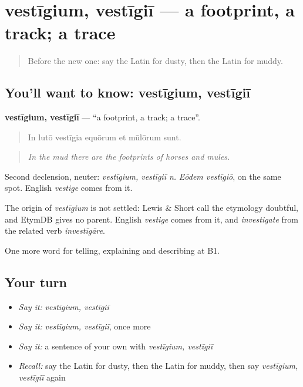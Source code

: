 \section[vestīgium, vestīgiī]{vestīgium, vestīgiī — a footprint, a track; a trace}

\label{lesson:LA-C426-vestigium}



\begin{quote}
Before the new one: say the Latin for dusty, then the Latin for muddy.
\end{quote}

\subsection*{You'll want to know: vestīgium, vestīgiī}
\textbf{vestīgium, vestīgiī} — \textquotedblleft{}a footprint, a track; a trace\textquotedblright{}.

\begin{quote}
In lutō vestīgia equōrum et mūlōrum sunt.
\end{quote}

\begin{quote}
\emph{In the mud there are the footprints of horses and mules.}
\end{quote}

Second declension, neuter: \emph{vestīgium, vestīgiī n.} \emph{Eōdem vestīgiō}, on the same spot. English \emph{vestige} comes from it.

\begin{cousinweb}
The origin of \emph{vestīgium} is not settled: Lewis \& Short call the etymology doubtful, and EtymDB gives no parent. English \emph{vestige} comes from it, and \emph{investigate} from the related verb \emph{investīgāre}.
\end{cousinweb}

\begin{grammarlens}[title={What you've built}]
One more word for telling, explaining and describing at B1.
\end{grammarlens}

\subsection*{Your turn}
\begin{itemize}
\raggedright
  \item \emph{Say it:} \emph{vestīgium, vestīgiī}
  \item \emph{Say it:} \emph{vestīgium, vestīgiī}, once more
  \item \emph{Say it:} a sentence of your own with \emph{vestīgium, vestīgiī}
  \item \emph{Recall:} say the Latin for dusty, then the Latin for muddy, then say \emph{vestīgium, vestīgiī} again
\end{itemize}

